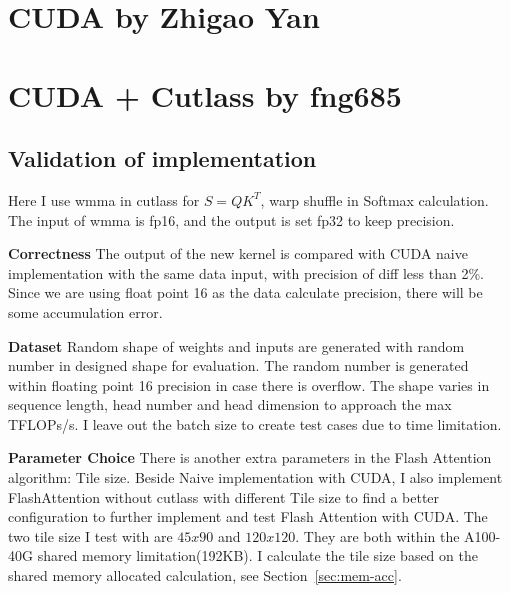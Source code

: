 \documentclass[11pt]{article}
\renewcommand\cite{\citep}  %
\begin{document}

\section{CUDA by Zhigao Yan}

\section{CUDA + Cutlass by fng685}

\subsection{Validation of implementation}
Here I use wmma in cutlass for $S=QK^{T}$, warp shuffle in Softmax calculation. The input of wmma is fp16, and the output is set fp32 to keep precision.

\textbf{Correctness} The output of the new kernel is compared with CUDA naive implementation with the same data input, with precision of diff less than 2\%. Since we are using float point 16 as the data calculate precision, there will be some accumulation error.

\textbf{Dataset} Random shape of weights and inputs are generated with random number in designed shape for evaluation. The random number is generated within floating point 16 precision in case there is overflow. The shape varies in sequence length, head number and head dimension to approach the max TFLOPs/s. I leave out the batch size to create test cases due to time limitation.

\textbf{Parameter Choice} There is another extra parameters in the Flash Attention algorithm: Tile size. Beside  Naive implementation with CUDA, I also implement FlashAttention without cutlass with different Tile size to find a better configuration to further implement and test Flash Attention with CUDA. The two tile size I test with are $45x90$ and $120x120$. They are both within the A100-40G shared memory limitation(192KB)\cite{nvidia2022a100}. I calculate the tile size based on the shared memory allocated calculation, see Section~\ref{sec:mem-acc}.
\end{document}
